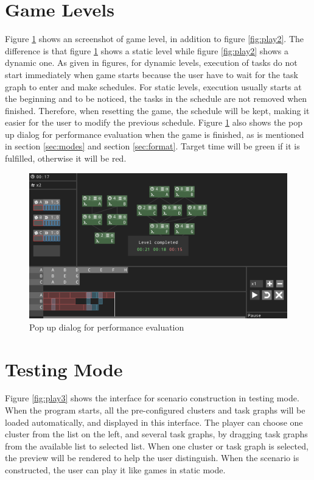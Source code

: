 \documentclass[msc,deptreport, cs]{infthesis}
\begin{document}
\section{Game Levels}

Figure \ref{fig:play6} shows an screenshot of game level, in addition to figure \ref{fig:play2}. The difference is that figure \ref{fig:play6} shows a static level while figure \ref{fig:play2} shows a dynamic one. As given in figures, for dynamic levels, execution of tasks do not start immediately when game starts because the user have to wait for the task graph to enter and make schedules. For static levels, execution usually starts at the beginning and to be noticed, the tasks in the schedule are not removed when finished. Therefore, when resetting the game, the schedule will be kept, making it easier for the user to modify the previous schedule. Figure \ref{fig:play6} also shows the pop up dialog for performance evaluation when the game is finished, as is mentioned in section \ref{sec:modes} and section \ref{sec:format}. Target time will be green if it is fulfilled, otherwise it will be red.

\begin{figure}[!htb]
  \centering
  \includegraphics[width=\columnwidth]{play6.png}
  \caption{Pop up dialog for performance evaluation}
  \label{fig:play6}
\end{figure}

\section{Testing Mode}

Figure \ref{fig:play3} shows the interface for scenario construction in testing mode. When the program starts, all the pre-configured clusters and task graphs will be loaded automatically, and displayed in this interface. The player can choose one cluster from the list on the left, and several task graphs, by dragging task graphs from the available list to selected list. When one cluster or task graph is selected, the preview will be rendered to help the user distinguish. When the scenario is constructed, the user can play it like games in static mode.
\end{document}
